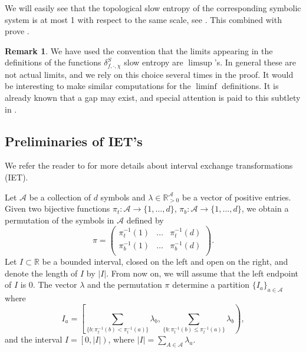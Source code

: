 \documentclass[oneside]{amsart}
\theoremstyle{plain}
\theoremstyle{definition}
\newtheorem{RMK}[THM]{Remark}
\newcommand{\<}{\langle}
\renewcommand{\>}{\rangle}
\newcommand{\R}{\mathbb{R}}
\newcommand{\A}{\mathcal{A}}
\renewcommand{\|}{|\!|} %
\begin{document}
We will easily see that the topological slow entropy of the corresponding symbolic system is at most 1 with respect to the same scale, see . This combined with  prove  .

\begin{RMK}
    We have used the convention that the limits appearing in the definitions of the functions $\delta_{f,\cdot,\chi}^S$ slow entropy are $\limsup$'s. In general these are not actual limits, and we rely on this choice several times in the proof. It would be interesting to make similar computations for the $\liminf$ definitions. It is already known that a gap may exist, and special attention is paid to this subtlety in \cite{BanKunWei2}. 
\end{RMK}


\subsection{Preliminaries of IET's}

We refer the reader to \cite{claynotes,Viana2006} for more details about interval exchange transformations (IET).

Let $\A$ be a collection of $d$ symbols and $\lambda\in\R^\A_{>0}$ be a vector of positive entries.
Given two bijective functions $\pi_t:\A \to \{1,\dots,d\}$, $\pi_b:\A \to \{1,\dots,d\}$, we obtain a permutation of the symbols in $\A$ defined by
\begin{equation*}
    \pi=\begin{pmatrix}
        \pi_t^{-1}(1) & \dots & \pi_t^{-1}(d)\\
        \pi_b^{-1}(1) & \dots & \pi_b^{-1}(d)\\
    \end{pmatrix}.
\end{equation*}
Let $I\subset \R$ be a bounded interval, closed on the left and open on the right, and denote the length of $I$ by $|I|$. From now on, we will assume that the left endpoint of $I$ is 0. The vector $\lambda$ and the permutation $\pi$ determine a partition $\{I_a\}_{a\in\A}$ where 
\begin{equation*}
I_{a}=\left[\sum_{\{b:\pi_t^{-1}(b)<\pi_t^{-1}(a)\}}\lambda_b,
 \sum_{\{b:\pi_t^{-1}(b)\leq \pi_t^{-1}(a)\}}\lambda_b
\right),
\end{equation*} and the interval $I = \left[0,|I|\right)$, where $ |I| = \sum_{A \in \A}\lambda_a.$
\end{document}
